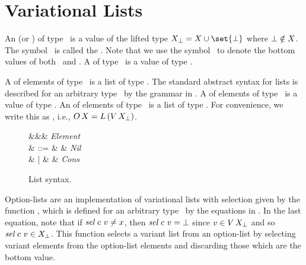 \section{Variational Lists}
\label{sec:olist}

An  (or ) of type \Val\ is a value of the lifted type $\LVal = \Val \cup \set{\Bot}$ where $\Bot \notin \Val$.
The symbol \Bot\ is called the .
Note that we use the symbol \Bot\ to denote the bottom values of both \LVal\ and \LValY.
A  of type \Val\ is a value of type \Var.

A  of elements of type \Val\ is a list of type \Lst.
The standard abstract syntax for lists is described for an arbitrary type \Val\ by the grammar in .
A  of elements of type \Val\ is a value of type \Var[(\Lst)].
An  of elements of type \Val\ is a list of type \Lst[(\Var)].
For convenience, we write this as \OLst, i.e., $\OLst = \Lst[(\Var)]$.

\begin{figure}[H]
  \onehalfspacing
  \begin{syntax}
    \val \in \Val &&& \textit{Element} \\
    \lst \in \Lst
    & ::= & \nil & \textit{Nil} \\
    & | & \val \cons \lst & \textit{Cons}
  \end{syntax}
  \caption{List syntax.}
  \label{fig:listsyn}
\end{figure}


Option-lists are an implementation of variational lists with selection given by the function \osel, which is defined for an arbitrary type \Val\ by the equations in .
In the last equation, note that if $\sel\ \cE\ \var \ne \val$, then $\sel\ \cE\ \var = \bot$ since $\var \in \Var$ and so $\sel\ \cE\ \var \in \LVal$.
This function selects a variant list from an option-list by selecting variant elements from the option-list elements and discarding those which are the bottom value.

